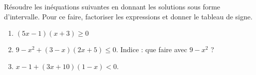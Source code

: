 
\begin{exercice}\label{exosmath-0325}

    Résoudre les inéquations suivantes en donnant les solutions sous forme d'intervalle. Pour ce faire, factoriser les expressions et donner le tableau de signe.
    \begin{enumerate}
        \item
            \( (5x-1)(x+3)\geq 0\)
        \item
            \( 9-x^2+(3-x)(2x+5)\leq 0\). Indice : que faire avec \( 9-x^2\) ?
        \item
            \( x-1+(3x+10)(1-x)<0\).
    \end{enumerate}

\end{exercice}
